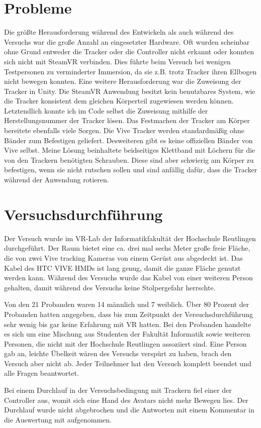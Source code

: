\section{Probleme}
Die größte Herausforderung während des Entwickeln als auch während des Versuchs war die große Anzahl an eingesetzter Hardware. Oft wurden scheinbar ohne Grund entweder die Tracker oder die Controller nicht erkannt oder konnten sich nicht mit SteamVR verbinden. Dies führte beim Versuch bei wenigen Testpersonen zu verminderter Immersion, da sie z.B. trotz Tracker ihren Ellbogen nicht bewegen konnten. 
Eine weitere Herausforderung war die Zuweisung der Tracker in Unity. Die SteamVR Anwendung besitzt kein benutzbares System, wie die Tracker konsistent dem gleichen Körperteil zugewiesen werden können. Letztendlich konnte ich im Code selbst die Zuweisung mithilfe der Herstellungsnummer der Tracker lösen.
Das Festmachen der Tracker am Körper bereitete ebenfalls viele Sorgen. Die Vive Tracker werden standardmäßig ohne Bänder zum Befestigen geliefert. Desweiteren gibt es keine offiziellen Bänder von Vive selbst. Meine Lösung beinhaltete beidseitiges Klettband mit Löchern für die von den Trackern benötigten Schrauben. Diese sind aber schwierig am Körper zu befestigen, wenn sie nicht rutschen sollen und sind anfällig dafür, dass die Tracker während der Anwendung rotieren.
 

\section{Versuchsdurchführung}
Der Versuch wurde im VR-Lab der Informatikfakultät der Hochschule Reutlingen durchgeführt. Der Raum bietet eine ca. drei mal sechs Meter große freie Fläche, die von zwei Vive tracking Kameras von einem Gerüst aus abgedeckt ist. Das Kabel des HTC VIVE HMDs ist lang genug, damit die ganze Fläche genutzt werden kann. Während des Versuchs wurde das Kabel von einer weiteren Person gehalten, damit während des Versuchs keine Stolpergefahr herrschte.

Von den 21 Probanden waren 14 männlich und 7 weiblich. Über 80 Prozent der Probanden hatten angegeben, dass bis zum Zeitpunkt der Versuchsdurchführung sehr wenig bis gar keine Erfahrung mit VR hatten. Bei den Probanden handelte es sich um eine Mischung aus Studenten der Fakultät Informatik sowie weiteren Personen, die nicht mit der Hochschule Reutlingen assoziiert sind. 
Eine Person gab an, leichte Übelkeit wären des Versuchs verspürt zu haben, brach den Versuch aber nicht ab. Jeder Teilnehmer hat den Versuch komplett beendet und alle Fragen beantwortet.

Bei einem Durchlauf in der Versuchsbedingung mit Trackern fiel einer der Controller aus, womit sich eine Hand des Avatars nicht mehr Bewegen lies. Der Durchlauf wurde nicht abgebrochen und die Antworten mit einem Kommentar in die Auswertung mit aufgenommen.




 
 
